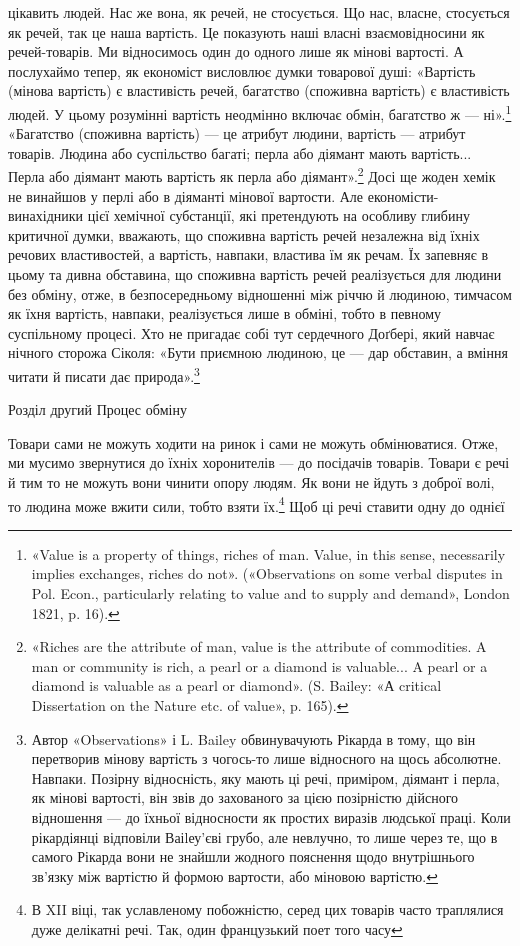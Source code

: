 цікавить людей. Нас же вона, як речей, не стосується. Що нас,
власне, стосується як речей, так це наша вартість. Це показують
наші власні взаємовідносини як речей-товарів. Ми відносимось
один до одного лише як мінові вартості. А послухаймо
тепер, як економіст висловлює думки товарової душі: «Вартість
(мінова вартість) є властивість речей, багатство (споживна вартість)
є властивість людей. У цьому розумінні вартість неодмінно
включає обмін, багатство ж — ні».\footnote{
«Value is a property of things, riches of man. Value, in this sense,
necessarily implies exchanges, riches do not». («Observations on some verbal
disputes in Pol. Econ., particularly relating to value and to supply and
demand», London 1821, p. 16).
} «Багатство (споживна вартість) —
це атрибут людини, вартість — атрибут товарів. Людина
або суспільство багаті; перла або діямант мають вартість...
Перла або діямант мають вартість як перла або діямант».\footnote{
«Riches are the attribute of man, value is the attribute of commodities.
A man or community is rich, a pearl or a diamond is valuable...
A pearl or a diamond is valuable as a pearl or diamond». (S. Bailey:
«А critical Dissertation on the Nature etc. of value», p. 165).
}
Досі ще жоден хемік не винайшов у перлі або в діяманті мінової
вартости. Але економісти-винахідники цієї хемічної субстанції,
які претендують на особливу глибину критичної думки, вважають,
що споживна вартість речей незалежна від їхніх речових властивостей,
а вартість, навпаки, властива їм як речам. Їх запевняє
в цьому та дивна обставина, що споживна вартість речей реалізується
для людини без обміну, отже, в безпосередньому відношенні
між річчю й людиною, тимчасом як їхня вартість, навпаки,
реалізується лише в обміні, тобто в певному суспільному процесі.
Хто не пригадає собі тут сердечного Доґбері, який навчає нічного
сторожа Сіколя: «Бути приємною людиною, це — дар обставин,
а вміння читати й писати дає природа».\footnote{
Автор «Observations» і L. Bailey обвинувачують Рікарда в тому,
що він перетворив мінову вартість з чогось-то лише відносного на щось
абсолютне. Навпаки. Позірну відносність, яку мають ці речі, приміром,
діямант і перла, як мінові вартості, він звів до захованого за цією позірністю
дійсного відношення — до їхньої відносности як простих виразів
людської праці. Коли рікардіянці відповіли Ваіlеу’єві грубо, але невлучно,
то лише через те, що в самого Рікарда вони не знайшли жодного
пояснення щодо внутрішнього зв’язку між вартістю й формою вартости,
або міновою вартістю.
}

Розділ другий
Процес обміну

Товари сами не можуть ходити на ринок і сами не можуть
обмінюватися. Отже, ми мусимо звернутися до їхніх хоронителів —
до посідачів товарів. Товари є речі й тим то не можуть вони чинити
опору людям. Як вони не йдуть з доброї волі, то людина може
вжити сили, тобто взяти їх.\footnote{
В XII віці, так уславленому побожністю, серед цих товарів часто
траплялися дуже делікатні речі. Так, один французький поет того часу
} Щоб ці речі ставити одну до однієї